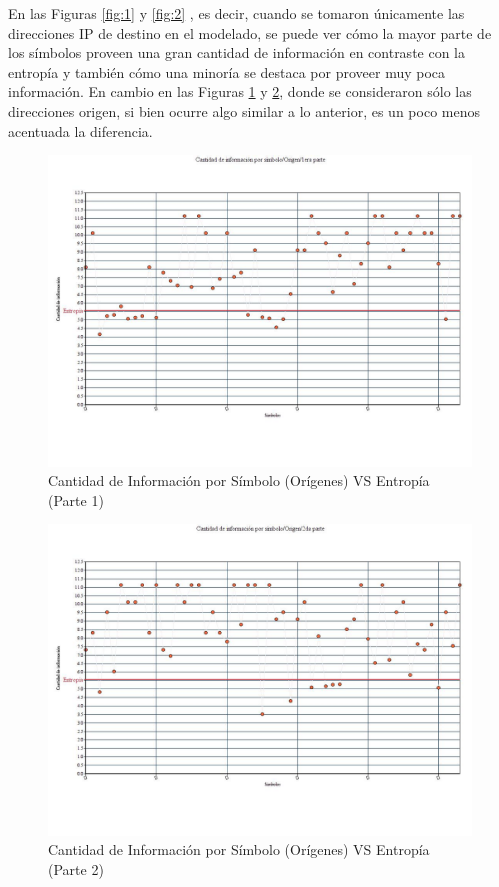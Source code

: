 En las Figuras \ref{fig:1} y \ref{fig:2} , es decir, cuando se tomaron únicamente las direcciones IP de destino en el modelado, se puede ver cómo la mayor parte de los símbolos proveen una gran cantidad de información en contraste con la entropía y también cómo una minoría se destaca por proveer muy poca información. En cambio en las Figuras \ref{fig:3} y \ref{fig:4}, donde se consideraron sólo las direcciones origen, si bien ocurre algo similar a lo anterior, es un poco menos acentuada la diferencia.

\begin{figure}[H]
  \centering
    \includegraphics[scale=0.45]{imagenes/graficos/entropiaCantInf/02origen1eraParte.jpg}
  \caption{Cantidad de Información por Símbolo (Orígenes) VS Entropía (Parte 1)}
  \label{fig:3}
\end{figure}


\begin{figure}[H]
  \centering
    \includegraphics[scale=0.45]{imagenes/graficos/entropiaCantInf/02origen2daParte.jpg}
  \caption{Cantidad de Información por Símbolo (Orígenes) VS Entropía (Parte 2)}
  \label{fig:4}
\end{figure}

